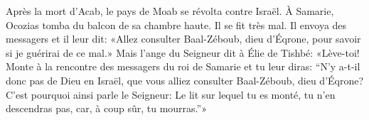 Après la mort d’Acab, le pays de Moab se révolta contre Israël.
À Samarie, Ocozias tomba du balcon de sa chambre haute.
	Il se fit très mal.
Il envoya des messagers et il leur dit:
	«Allez consulter Baal-Zéboub, dieu d’Éqrone, pour savoir si je guérirai de ce mal.»
Mais l’ange du Seigneur dit à Élie de Tishbé:
	«Lève-toi! Monte à la rencontre des messagers du roi de Samarie et tu leur diras:
	“N’y a-t-il donc pas de Dieu en Israël,
	que vous alliez consulter Baal-Zéboub, dieu d’Éqrone?
	C’est pourquoi ainsi parle le Seigneur:
	Le lit sur lequel tu es monté, tu n’en descendras pas, car, à coup sûr, tu mourras.”» 
